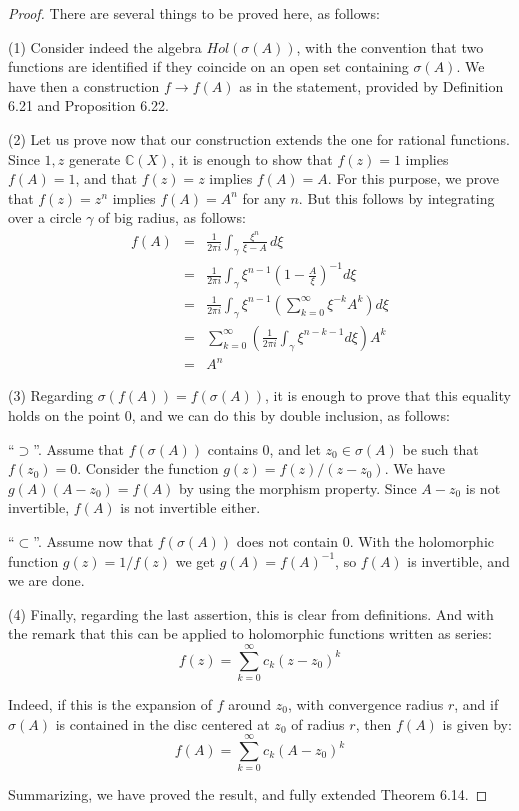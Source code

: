 \documentclass[12pt]{amsbook}
\begin{document}
\begin{proof}
There are several things to be proved here, as follows:

\medskip

(1) Consider indeed the algebra $Hol(\sigma(A))$, with the convention that two functions are identified if they coincide on an open set containing $\sigma(A)$. We have then a construction $f\to f(A)$ as in the statement, provided by Definition 6.21 and Proposition 6.22.

\medskip

(2) Let us prove now that our construction extends the one for rational functions. Since $1,z$ generate $\mathbb C(X)$, it is enough to show that $f(z)=1$ implies $f(A)=1$, and that $f(z)=z$ implies $f(A)=A$. For this purpose, we prove that $f(z)=z^n$ implies $f(A)=A^n$ for any $n$. But this follows by integrating over a circle $\gamma$ of big radius, as follows:
\begin{eqnarray*}
f(A)
&=&\frac{1}{2\pi i}\int_\gamma\frac{\xi^n}{\xi-A}\,d\xi\\
&=&\frac{1}{2\pi i}\int_\gamma \xi^{n-1}\left(1-\frac{A}{\xi}\right)^{-1}d\xi\\
&=&\frac{1}{2\pi i}\int_\gamma \xi^{n-1}\left(\sum_{k=0}^\infty \xi^{-k}A^k\right) d\xi\\
&=&\sum_{k=0}^\infty\left(\frac{1}{2\pi i}\int_\gamma\xi^{n-k-1}d\xi\right)A^k\\
&=&A^n
\end{eqnarray*}

(3) Regarding $\sigma(f(A))=f(\sigma(A))$, it is enough to prove that this equality holds on the point $0$, and we can do this by double inclusion, as follows:

\medskip

``$\supset$''. Assume that $f(\sigma(A))$ contains $0$, and let $z_0\in\sigma(A)$ be such that $f(z_0)=0$. Consider the function $g(z)=f(z)/(z-z_0)$.  We have $g(A)(A-z_0)=f(A)$ by using the morphism property. Since $A-z_0$ is not invertible, $f(A)$ is not invertible either.

\medskip

``$\subset$''. Assume now that $f(\sigma(A))$ does not contain $0$. With the holomorphic function $g(z)=1/f(z)$ we get $g(A)=f(A)^{-1}$, so $f(A)$ is invertible, and we are done.

\medskip

(4) Finally, regarding the last assertion, this is clear from definitions. And with the remark that this can be applied to holomorphic functions written as series:
$$f(z)=\sum_{k=0}^\infty c_k(z-z_0)^k$$

Indeed, if this is the expansion of $f$ around $z_0$, with convergence radius $r$, and if $\sigma(A)$ is contained in the disc centered at $z_0$ of radius $r$, then $f(A)$ is given by:
$$f(A)=\sum_{k=0}^\infty c_k(A-z_0)^k$$

Summarizing, we have proved the result, and fully extended Theorem 6.14.
\end{proof}
\end{document}
